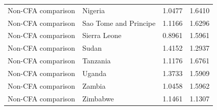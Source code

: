 \begin{table}
\begin{tabular}[t]{llrr}
Non-CFA comparison & Nigeria & 1.0477 & 1.6410\\
Non-CFA comparison & Sao Tome and Principe & 1.1166 & 1.6296\\
Non-CFA comparison & Sierra Leone & 0.8961 & 1.5961\\
\addlinespace
Non-CFA comparison & Sudan & 1.4152 & 1.2937\\
Non-CFA comparison & Tanzania & 1.1176 & 1.6761\\
Non-CFA comparison & Uganda & 1.3733 & 1.5909\\
Non-CFA comparison & Zambia & 1.0458 & 1.5962\\
Non-CFA comparison & Zimbabwe & 1.1461 & 1.1307\\
\bottomrule
\end{tabular}
\end{table}